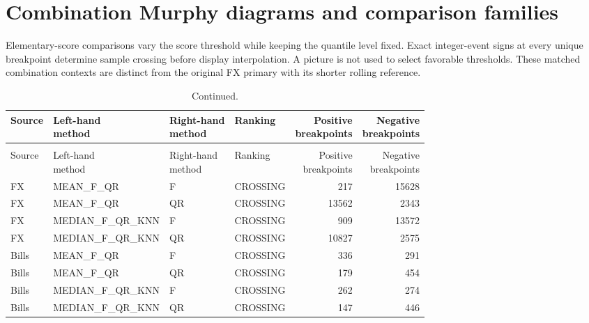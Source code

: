 \section{Combination Murphy diagrams and comparison families}\label{sup:wp3-murphy}

Elementary-score comparisons vary the score threshold while
keeping the quantile level fixed. Exact integer-event signs at every unique
breakpoint determine sample crossing before display interpolation. A picture
is not used to select favorable thresholds. These matched combination
contexts are distinct from the original FX primary with its shorter rolling
reference.
\begingroup
\footnotesize
\setlength{\tabcolsep}{3pt}
\renewcommand{\arraystretch}{1.12}
\begin{longtable}{lp{34mm}p{18mm}lrr}
\caption{Every combination Murphy comparison in the original-primary contexts. Crossing prevents threshold-uniform sample dominance.}\\
\toprule
Source & \shortstack{Left-hand\\method} & \shortstack{Right-hand\\method} & Ranking & \shortstack{Positive\\breakpoints} & \shortstack{Negative\\breakpoints} \\
\midrule
\endfirsthead
\caption[]{Continued.}\\
\toprule
Source & \shortstack{Left-hand\\method} & \shortstack{Right-hand\\method} & Ranking & \shortstack{Positive\\breakpoints} & \shortstack{Negative\\breakpoints} \\
\midrule
\endhead
\bottomrule
\endfoot
FX & MEAN\_F\_QR & F & CROSSING & 217 & 15628 \\
FX & MEAN\_F\_QR & QR & CROSSING & 13562 & 2343 \\
FX & MEDIAN\_F\_QR\_KNN & F & CROSSING & 909 & 13572 \\
FX & MEDIAN\_F\_QR\_KNN & QR & CROSSING & 10827 & 2575 \\
Bills & MEAN\_F\_QR & F & CROSSING & 336 & 291 \\
Bills & MEAN\_F\_QR & QR & CROSSING & 179 & 454 \\
Bills & MEDIAN\_F\_QR\_KNN & F & CROSSING & 262 & 274 \\
Bills & MEDIAN\_F\_QR\_KNN & QR & CROSSING & 147 & 446 \\
\end{longtable}
\endgroup

